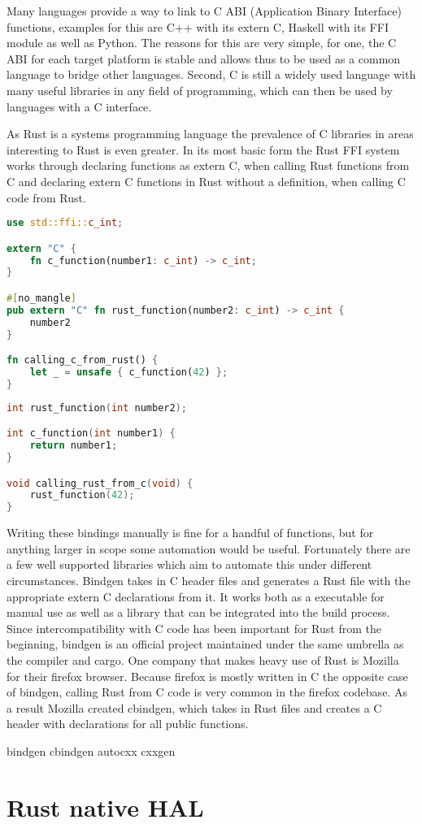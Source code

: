 Many languages provide a way to link to C ABI (Application Binary Interface) functions, examples for this are C++ with its extern C, Haskell with its FFI module as well as Python.
The reasons for this are very simple, for one, the C ABI for each target platform is stable and allows thus to be used as a common language to bridge other languages.
Second, C is still a widely used language with many useful libraries in any field of programming, which can then be used by languages with a C interface.

As Rust is a systems programming language the prevalence of C libraries in areas interesting to Rust is even greater.
In its most basic form the Rust FFI system works through declaring functions as extern C, when calling Rust functions from C
and declaring extern C functions in Rust without a definition, when calling C code from Rust.

\begin{lstlisting}[language=Rust,style=colouredRust]
use std::ffi::c_int;

extern "C" {
    fn c_function(number1: c_int) -> c_int;
}

#[no_mangle]
pub extern "C" fn rust_function(number2: c_int) -> c_int {
    number2
}

fn calling_c_from_rust() {
    let _ = unsafe { c_function(42) };
}
\end{lstlisting}

\begin{lstlisting}[language=C]
int rust_function(int number2);

int c_function(int number1) {
    return number1;
}

void calling_rust_from_c(void) {
    rust_function(42);
}
\end{lstlisting}

Writing these bindings manually is fine for a handful of functions, but for anything larger in scope some automation would be useful.
Fortunately there are a few well supported libraries which aim to automate this under different circumstances.
Bindgen takes in C header files and generates a Rust file with the appropriate extern C declarations from it.
It works both as a executable for manual use as well as a library that can be integrated into the build process.
Since intercompatibility with C code has been important for Rust from the beginning,
bindgen is an official project maintained under the same umbrella as the compiler and cargo.
One company that makes heavy use of Rust is Mozilla for their firefox browser.
Because firefox is mostly written in C the opposite case of bindgen, calling Rust from C code is very common in the firefox codebase.
As a result Mozilla created cbindgen, which takes in Rust files and creates a C header with declarations for all public functions.

bindgen
cbindgen
autocxx
cxxgen



\section{Rust native HAL}
\label{sec:concept_and_implementation:hal}